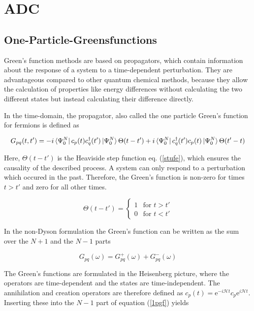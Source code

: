 \chapter{\acl{ADC}}
\section{One-Particle-Greensfunctions}\label{greensfkt}

Green's function methods are based on propagators, which contain information
about the response of a system to a time-dependent perturbation.\cite{McWeeny89}
They are advantageous compared to other quantum chemical methods, because they
allow the calculation of properties like energy differences without calculating
the two different states but instead calculating their difference directly.

In the time-domain, the propagator, also called the one particle Green's function
for fermions is defined as

\begin{equation}\label{1pgf}
G_{pq}(t,t') = -i \bra{\Psi_0^N}c_p(t)c_q^\dagger(t')\ket{\Psi_0^N}\Theta(t-t') +i \bra{\Psi_0^N}c_q^\dagger(t')c_p(t)\ket{\Psi_0^N}\Theta(t'-t)
\end{equation}

Here, $\Theta(t-t')$ is the Heaviside step function eq. (\ref{stufe}),
which ensures the causality of the described process. A system can only
respond to a perturbation which occured in the past. Therefore, the Green's
function is non-zero for times $t>t'$ and zero for all other times. \cite{nolting7}

\begin{equation}\label{stufe}
\Theta(t-t') = \begin{cases}
1 & \text{for } t>t'\\
0 & \text{for } t<t'
\end{cases}
\end{equation}

In the non-Dyson formulation \cite{Schirmer89} the Green's function can be
written as the sum over the $N+1$ and the $N-1$ parts

\begin{equation}
G_{pq}(\omega) = G_{pq}^+(\omega) + G_{pq}^-(\omega)
\end{equation}

The Green's functions are formulated in the Heisenberg picture, where the
operators are time-dependent and the states are time-independent.
The annihilation and creation operators are therefore defined as
$c_p(t) = \mathrm{e}^{-i\mathcal{H} t} c_p \mathrm{e}^{i\mathcal{H} t}$.
Inserting these into the $N-1$ part of equation (\ref{1pgf}) yields


